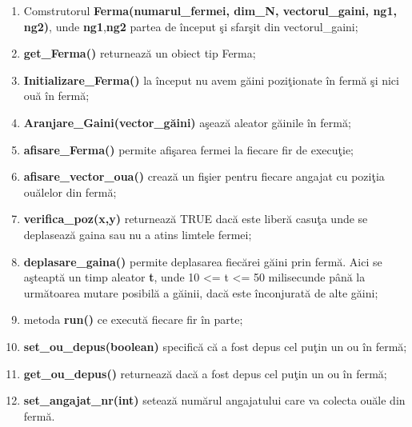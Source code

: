 \documentclass[12pt,a4paper]{article}
\begin{document}
	\begin{enumerate}
		\item Comstrutorul \textbf{Ferma(numarul\_fermei, dim\_N, vectorul\_gaini, ng1, ng2)},  unde \textbf{ng1},\textbf{ng2} partea de \^{i}nceput \c{s}i sfar\c{s}it din vectorul\_gaini;
		\item \textbf{get\_Ferma()} returneaz\u{a} un obiect tip Ferma;
		\item \textbf{Initializare\_Ferma()} la \^{i}nceput nu avem g\u{a}ini pozi\c{t}ionate \^{i}n ferm\u{a} \c{s}i nici ou\u{a} \^{i}n ferm\u{a};
		\item \textbf{Aranjare\_Gaini(vector\_g\u{a}ini)} a\c{s}eaz\u{a} aleator g\u{a}inile \^{i}n ferm\u{a};
		\item \textbf{afisare\_Ferma()} permite afi\c{s}area fermei la fiecare fir de execu\c{t}ie;
		\item \textbf{afisare\_vector\_oua()} creaz\u{a} un fi\c{s}ier pentru fiecare angajat cu pozi\c{t}ia ou\u{a}lelor din ferm\u{a};		
		\item \textbf{verifica\_poz(x,y)} returneaz\u{a} TRUE dac\u{a} este liber\u{a} casu\c{t}a unde se deplaseaz\u{a} gaina sau nu a atins limtele fermei;
		\item \textbf{deplasare\_gaina()} permite deplasarea fiec\u{a}rei g\u{a}ini prin ferm\u{a}. Aici se a\c{s}teapt\u{a} un timp aleator \textbf{t}, unde 10 <= t <= 50 milisecunde p\^{a}n\u{a} la urm\u{a}toarea mutare posibil\u{a} a g\u{a}inii, dac\u{a} este \^{i}nconjurat\u{a} de alte g\u{a}ini;
		\item metoda \textbf{run()} ce execut\u{a} fiecare fir \^{i}n parte;
		\item \textbf{set\_ou\_depus(boolean)} specific\u{a} c\u{a} a fost depus cel pu\c{t}in un ou \^{i}n ferm\u{a};
		\item \textbf{get\_ou\_depus()} returneaz\u{a} dac\u{a} a fost depus cel pu\c{t}in un ou \^{i}n ferm\u{a};
		\item \textbf{set\_angajat\_nr(int)} seteaz\u{a} num\u{a}rul angajatului care va colecta ou\u{a}le din ferm\u{a}.
	\end{enumerate}
	
\end{document}
